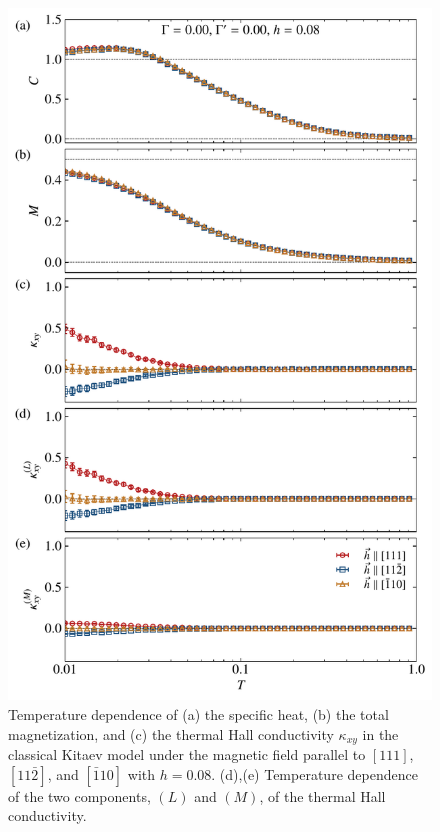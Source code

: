 \documentclass[reprint,amsmath,amssymb,aps,prx]{revtex4-2}
\begin{document}
\begin{figure}[tbh] 
\begin{center} 
\includegraphics[width=0.9\linewidth]{fig_K-1.0_G0.00_Gp0.00_h0.08.pdf}
\vspace{-0.5cm} 
\caption{Temperature dependence of (a) the specific heat, (b) the total magnetization, and
(c) the thermal Hall conductivity $\kappa_{xy}$ in the classical Kitaev model under the magnetic field parallel to $[111]$, $[11\bar{2}]$, and $[\bar{1}10]$ with $h=0.08$.
(d),(e) Temperature dependence of the two components, $(L)$ and $(M)$, of the thermal Hall conductivity.}
\label{fig_classical_adep008}
\end{center}
\end{figure}
\end{document}
